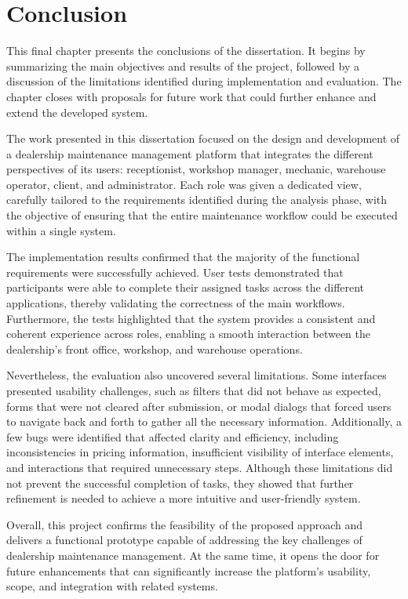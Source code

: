 \chapter{Conclusion}%
\label{chapter:conclusion}

\begin{introduction}
This final chapter presents the conclusions of the dissertation. It begins by summarizing the main objectives and results of the project, followed by a discussion of the limitations identified during implementation and evaluation. The chapter closes with proposals for future work that could further enhance and extend the developed system.
\end{introduction} 

The work presented in this dissertation focused on the design and development of a dealership maintenance management platform that integrates the different perspectives of its users: receptionist, workshop manager, mechanic, warehouse operator, client, and administrator. Each role was given a dedicated view, carefully tailored to the requirements identified during the analysis phase, with the objective of ensuring that the entire maintenance workflow could be executed within a single system.

The implementation results confirmed that the majority of the functional requirements were successfully achieved. User tests demonstrated that participants were able to complete their assigned tasks across the different applications, thereby validating the correctness of the main workflows. Furthermore, the tests highlighted that the system provides a consistent and coherent experience across roles, enabling a smooth interaction between the dealership's front office, workshop, and warehouse operations.

Nevertheless, the evaluation also uncovered several limitations. Some interfaces presented usability challenges, such as filters that did not behave as expected, forms that were not cleared after submission, or modal dialogs that forced users to navigate back and forth to gather all the necessary information. Additionally, a few bugs were identified that affected clarity and efficiency, including inconsistencies in pricing information, insufficient visibility of interface elements, and interactions that required unnecessary steps. Although these limitations did not prevent the successful completion of tasks, they showed that further refinement is needed to achieve a more intuitive and user-friendly system.

Overall, this project confirms the feasibility of the proposed approach and delivers a functional prototype capable of addressing the key challenges of dealership maintenance management. At the same time, it opens the door for future enhancements that can significantly increase the platform's usability, scope, and integration with related systems.

